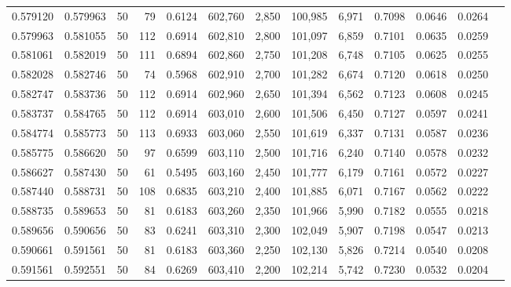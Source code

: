\begin{tabular}{rrrrrrrrrrrrr}
0.579120 & 0.579963 &    50 &  79 &                                     0.6124 & 602,760 &   2,850 & 100,985 &   6,971 & 0.7098 & 0.0646 & 0.0264 \\
0.579963 & 0.581055 &    50 & 112 &                                     0.6914 & 602,810 &   2,800 & 101,097 &   6,859 & 0.7101 & 0.0635 & 0.0259 \\
0.581061 & 0.582019 &    50 & 111 &                                     0.6894 & 602,860 &   2,750 & 101,208 &   6,748 & 0.7105 & 0.0625 & 0.0255 \\
0.582028 & 0.582746 &    50 &  74 &                                     0.5968 & 602,910 &   2,700 & 101,282 &   6,674 & 0.7120 & 0.0618 & 0.0250 \\
0.582747 & 0.583736 &    50 & 112 &                                     0.6914 & 602,960 &   2,650 & 101,394 &   6,562 & 0.7123 & 0.0608 & 0.0245 \\
0.583737 & 0.584765 &    50 & 112 &                                     0.6914 & 603,010 &   2,600 & 101,506 &   6,450 & 0.7127 & 0.0597 & 0.0241 \\
0.584774 & 0.585773 &    50 & 113 &                                     0.6933 & 603,060 &   2,550 & 101,619 &   6,337 & 0.7131 & 0.0587 & 0.0236 \\
0.585775 & 0.586620 &    50 &  97 &                                     0.6599 & 603,110 &   2,500 & 101,716 &   6,240 & 0.7140 & 0.0578 & 0.0232 \\
0.586627 & 0.587430 &    50 &  61 &                                     0.5495 & 603,160 &   2,450 & 101,777 &   6,179 & 0.7161 & 0.0572 & 0.0227 \\
0.587440 & 0.588731 &    50 & 108 &                                     0.6835 & 603,210 &   2,400 & 101,885 &   6,071 & 0.7167 & 0.0562 & 0.0222 \\
0.588735 & 0.589653 &    50 &  81 &                                     0.6183 & 603,260 &   2,350 & 101,966 &   5,990 & 0.7182 & 0.0555 & 0.0218 \\
0.589656 & 0.590656 &    50 &  83 &                                     0.6241 & 603,310 &   2,300 & 102,049 &   5,907 & 0.7198 & 0.0547 & 0.0213 \\
0.590661 & 0.591561 &    50 &  81 &                                     0.6183 & 603,360 &   2,250 & 102,130 &   5,826 & 0.7214 & 0.0540 & 0.0208 \\
0.591561 & 0.592551 &    50 &  84 &                                     0.6269 & 603,410 &   2,200 & 102,214 &   5,742 & 0.7230 & 0.0532 & 0.0204 \\

\end{tabular}
